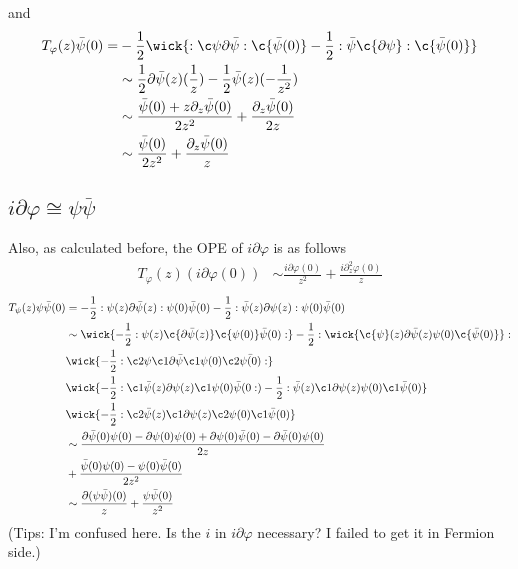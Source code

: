 and
\[
\begin{aligned}
T_\varphi(z) \bar{\psi}(0) =& - \frac{1}{2}\wick{:\c\psi \partial\bar{\psi}:\c{\bar\psi(0)} - \frac{1}{2}: \bar{\psi} \c{\partial \psi}: \c{\bar{\psi}(0)}}\\
&\sim  \frac{1}{2}\partial\bar{\psi}(z)(\frac{1}{z}) - \frac{1}{2} \bar{\psi}(z) (-\frac{1}{z^2})\\
&\sim \frac{\bar{\psi}(0)+ z\partial_z \bar{\psi}(0)}{2 z^2} + \frac{\partial_z \bar{\psi}(0)}{2z}\\
&\sim \frac{\bar{\psi}(0)}{2z^2} + \frac{\partial_z \bar{\psi}(0)}{z}\\
\end{aligned}
\]
\subsection{$i\partial\varphi\cong\psi \bar{\psi}$ }
Also, as calculated before, the OPE of $i\partial\varphi$ is as follows
\[
\begin{aligned}
T_\varphi(z) (i\partial\varphi(0))& \sim \frac{i\partial \varphi(0)}{z^2} + \frac{i \partial^2_z \varphi(0)}{z} 
\end{aligned}
\]
\[
\begin{aligned}
T_\psi(z) \psi \bar{\psi}(0)&= -\frac{1}{2} : \psi(z) \partial\bar{\psi}(z): \psi(0) \bar{\psi}(0) - \frac{1}{2}: \bar{\psi}(z) \partial \psi(z) : \psi(0) \bar{\psi}(0)\\
&\sim \wick{-\frac{1}{2} : \psi(z) \c{\partial \bar{\psi}(z)}\c{\psi(0)} \bar{\psi}(0):} - \frac{1}{2}: \wick{\c{\psi}(z) \partial \bar{\psi}(z) \psi(0) \c{\bar{\psi}(0)}}:\\
& \wick{-\frac{1}{2}: \c2{\psi}\c1{\partial \bar{\psi}} \c1{\psi(0)} \c2{\bar{\psi(0)}}:}\\
& \wick{-\frac{1}{2}:\c1{\bar{\psi}(z)} \partial\psi(z) \c1\psi(0) \bar{\psi}(0:) - \frac{1}{2}: \bar{\psi}(z) \c1{\partial\psi(z)} \psi(0) \c1{\bar{\psi}(0)} } \\
& \wick{-\frac{1}{2}: \c2{\bar{\psi}(z)} \c1{\partial\psi(z)} \c2{\psi(0)} \c1{\bar{\psi}(0)}}\\
&\sim  \frac{\partial \bar{\psi}(0) \psi(0)- \partial \psi(0) \psi(0) + \partial\psi(0) \bar{\psi}(0) - \partial\bar{\psi}(0)\psi(0)}{2z}\\&+\frac{\bar{\psi}(0) \psi(0)  - \psi(0) \bar{\psi}(0)}{2z^2}\\
&\sim \frac{\partial(\psi\bar{\psi})(0)}{z}+ \frac{\psi\bar{\psi}(0)}{z^2}
\end{aligned}
\]
(Tips: I'm confused here. Is the $i$ in $i \partial\varphi$ necessary? I failed to get it in Fermion side.)
